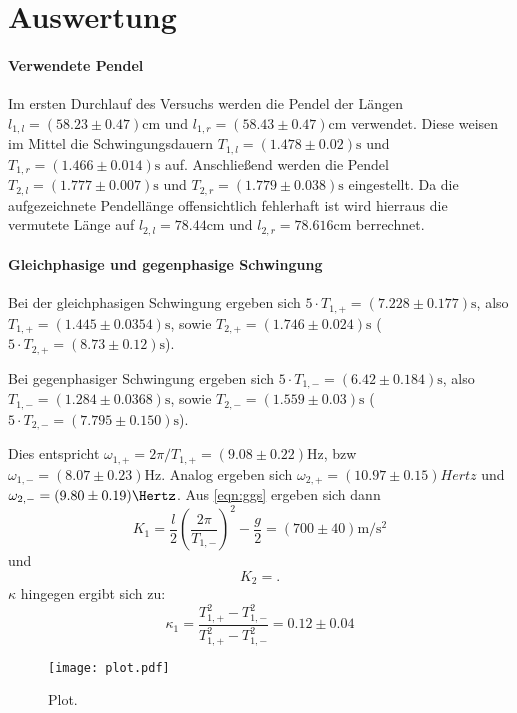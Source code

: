 \section{Auswertung}
\label{sec:Auswertung}
\paragraph{Verwendete Pendel}
Im ersten Durchlauf des Versuchs werden die Pendel der Längen $l_{1,l} = (58.23 \pm 0.47) \si{\centi\meter}$ und $l_{1,r} = (58.43 \pm 0.47) \si{\centi\meter}$ verwendet. Diese weisen im Mittel die Schwingungsdauern $T_{1,l} = (1.478 \pm 0.02) \si{\second}$ und $T_{1,r} = (1.466 \pm 0.014) \si{\second}$ auf.
Anschließend werden die Pendel $ T_{2,l} = (1.777 \pm 0.007)\si{\second}$ und $T_{2,r} = (1.779 \pm 0.038)\si{\second}$ eingestellt. Da die aufgezeichnete Pendellänge offensichtlich fehlerhaft ist wird hierraus die vermutete Länge auf $l_{2,l} =78.44 \si{\centi \meter}$ und $l_{2,r} = 78.616 \si{\centi\meter}$ berrechnet.

\paragraph{Gleichphasige und gegenphasige Schwingung}

Bei der gleichphasigen Schwingung ergeben sich $5 \cdot T_{1,+} = (7.228 \pm 0.177) \si{\second}$, also $T_{1,+} = (1.445 \pm 0.0354) \si{\second}$, sowie $T_{2,+} = (1.746 \pm 0.024) \si{\second}$ ($5 \cdot T_{2,+} = (8.73 \pm 0.12)\si{\second}$).

Bei gegenphasiger Schwingung ergeben sich $5 \cdot T_{1,-} = (6.42 \pm 0.184) \si{\second}$, also $T_{1,-} = (1.284 \pm 0.0368) \si{\second}$, sowie $T_{2,-} = (1.559 \pm 0.03) \si{\second}$ ($5 \cdot T_{2,-} = (7.795 \pm 0.150)\si{\second}$).

Dies entspricht $\omega_{1,+} = 2\pi / T_{1,+} = (9.08 \pm 0.22) \si{\hertz}$, bzw $\omega_{1,-} = (8.07 \pm 0.23) \si{\hertz}$. Analog ergeben sich $\omega_{2,+} = (10.97 \pm 0.15) \si{Hertz}$ und $\omega_{2,-} = (9.80 \pm 0.19) \si{\Hertz}$.
Aus \eqref{eqn:ggs} ergeben sich dann
\begin{equation*}
  K_1 =\frac{l}{2} \left(\frac{2\pi}{T_{1,-}} \right)^2-\frac{g}{2}= (700 \pm 40)\si{\meter\per\second\squared}
\end{equation*}
und
\begin{equation*}
  K_2 =   .
\end{equation*}
$\kappa$ hingegen ergibt sich zu:
\begin{equation*}
  \kappa_1 = \frac{T_{1,+}^2 - T_{1,-}^2}{T_{1,+}^2 - T_{1,-}^2} = 0.12 \pm 0.04
\end{equation*}

\begin{figure}
  \centering
  \texttt{[image: plot.pdf]}
  \caption{Plot.}
  \label{fig:plot}
\end{figure}

